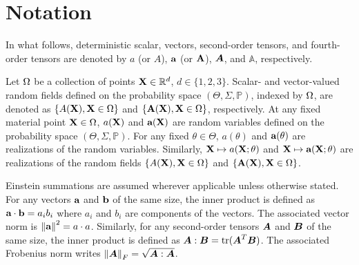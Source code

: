 \section{Notation}

In what follows, deterministic scalar, vectors, second-order tensors, and fourth-order tensors are denoted by $a$ (or $A$), $\textbf{a}$ (or $\textbf{A}$), $\boldsymbol{A}$, and $\mathbb{A}$, respectively.

Let $\Omega$ be a collection of points $\textbf{X} \in \mathbb{R}^d$, $d \in \{1, 2, 3\}$. Scalar- and vector-valued random fields defined on the probability space $(\Theta, \Sigma, \mathbb{P})$, indexed by $\Omega$, are denoted as $\{ A(\textbf{X}), \textbf{X} \in \Omega \}$ and $\{ \textbf{A}(\textbf{X}), \textbf{X} \in \Omega \}$, respectively.
At any fixed material point $\textbf{X} \in \Omega$, $a(\textbf{X})$ and $\textbf{a}(\textbf{X})$ are random variables defined on the probability space $(\Theta, \Sigma, \mathbb{P})$. For any fixed $\theta \in \Theta$, $a(\theta)$ and $\textbf{a}(\theta)$ are realizations of the random variables.
Similarly, $\textbf{X} \mapsto a(\textbf{X};\theta)$ and $\textbf{X} \mapsto \textbf{a}(\textbf{X};\theta)$ are realizations of the random fields $\{ A(\textbf{X}), \textbf{X} \in \Omega \}$ and $\{ \textbf{A}(\textbf{X}), \textbf{X} \in \Omega \}$.

Einstein summations are assumed wherever applicable unless otherwise stated. For any vectors $\textbf{a}$ and $\textbf{b}$ of the same size, the inner product is defined as $\textbf{a} \cdot \textbf{b} = a_ib_i$ where $a_i$ and $b_i$ are components of the vectors. The associated vector norm is $\left\lVert\textbf{a}\right\rVert^2 = a \cdot a$. Similarly, for any second-order tensors $\boldsymbol{A}$ and $\boldsymbol{B}$ of the same size, the inner product is defined as $\boldsymbol{A} : \boldsymbol{B} = \operatorname{tr}(\boldsymbol{A}^T \boldsymbol{B})$. The associated Frobenius norm writes $\left\lVert\boldsymbol{A}\right\rVert_F = \sqrt{\boldsymbol{A} : \boldsymbol{A}}$.
